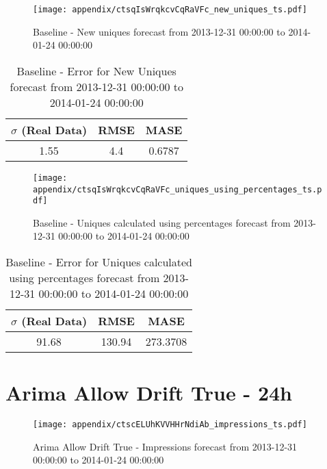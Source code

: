 \begin{figure}[H] \begin{center} \leavevmode
\texttt{[image: appendix/ctsqIsWrqkcvCqRaVFc\_new\_uniques\_ts.pdf]} \caption{
Baseline - New uniques forecast from 2013-12-31 00:00:00 to 2014-01-24 00:00:00} \label{fig:appendix/ctsqIsWrqkcvCqRaVFc_new_uniques_ts.pdf} \end{center}
\end{figure}

\begin{table}[H]
\centering
\footnotesize
\begin{tabular}{ccc}
$\sigma$ (Real Data) & RMSE & MASE   \\ \hline
1.55 & 4.4 & 0.6787 \\
\end{tabular}

\vspace{0.5cm}

\caption{
Baseline - Error for New Uniques forecast from 2013-12-31 00:00:00 to 2014-01-24 00:00:00}
\end{table}

\begin{figure}[H] \begin{center} \leavevmode
\texttt{[image: appendix/ctsqIsWrqkcvCqRaVFc\_uniques\_using\_percentages\_ts.pdf]} \caption{
Baseline - Uniques calculated using percentages forecast from 2013-12-31 00:00:00 to 2014-01-24 00:00:00} \label{fig:appendix/ctsqIsWrqkcvCqRaVFc_uniques_using_percentages_ts.pdf} \end{center}
\end{figure}

\begin{table}[H]
\centering
\footnotesize
\begin{tabular}{ccc}
$\sigma$ (Real Data) & RMSE & MASE   \\ \hline
91.68 & 130.94 & 273.3708 \\
\end{tabular}

\vspace{0.5cm}

\caption{
Baseline - Error for Uniques calculated using percentages forecast from 2013-12-31 00:00:00 to 2014-01-24 00:00:00}
\end{table}

\section{Arima Allow Drift True - 24h}
\begin{figure}[H] \begin{center} \leavevmode
\texttt{[image: appendix/ctscELUhKVVHHrNdiAb\_impressions\_ts.pdf]} \caption{
Arima Allow Drift True - Impressions forecast from 2013-12-31 00:00:00 to 2014-01-24 00:00:00} \label{fig:appendix/ctscELUhKVVHHrNdiAb_impressions_ts.pdf} \end{center}
\end{figure}

